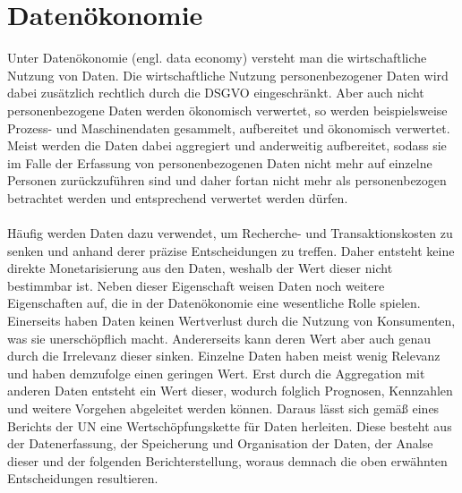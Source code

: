 \section{Datenökonomie}
Unter Datenökonomie (engl. data economy) versteht man die wirtschaftliche Nutzung von Daten. Die wirtschaftliche Nutzung personenbezogener Daten wird dabei zusätzlich rechtlich durch die DSGVO eingeschränkt. Aber auch nicht personenbezogene Daten werden ökonomisch verwertet, so werden beispielsweise Prozess- und Maschinendaten gesammelt, aufbereitet und ökonomisch verwertet. \cite{bpb_2019} Meist werden die Daten dabei aggregiert und anderweitig aufbereitet, sodass sie im Falle der Erfassung von personenbezogenen Daten nicht mehr auf einzelne Personen zurückzuführen sind und daher fortan nicht mehr als personenbezogen betrachtet werden und entsprechend verwertet werden dürfen. 
\\
\\
\noindent Häufig werden Daten dazu verwendet, um Recherche- und Transaktionskosten zu senken und anhand derer präzise Entscheidungen zu treffen. Daher entsteht keine direkte Monetarisierung aus den Daten, weshalb der Wert dieser nicht bestimmbar ist. Neben dieser Eigenschaft weisen Daten noch weitere Eigenschaften auf, die in der Datenökonomie eine wesentliche Rolle spielen. Einerseits haben Daten keinen Wertverlust durch die Nutzung von Konsumenten, was sie unerschöpflich macht. Andererseits kann deren Wert aber auch genau durch die Irrelevanz dieser sinken. Einzelne Daten haben meist wenig Relevanz und haben demzufolge einen geringen Wert. Erst durch die Aggregation mit anderen Daten entsteht ein Wert dieser, wodurch folglich Prognosen, Kennzahlen und weitere Vorgehen abgeleitet werden können. Daraus lässt sich gemäß eines Berichts der \gls{UN} eine Wertschöpfungskette für Daten herleiten. Diese besteht aus der Datenerfassung, der Speicherung und Organisation der Daten, der Analse dieser und der folgenden Berichterstellung, woraus demnach die oben erwähnten Entscheidungen resultieren. \cite{un_2019}
\\
\\
